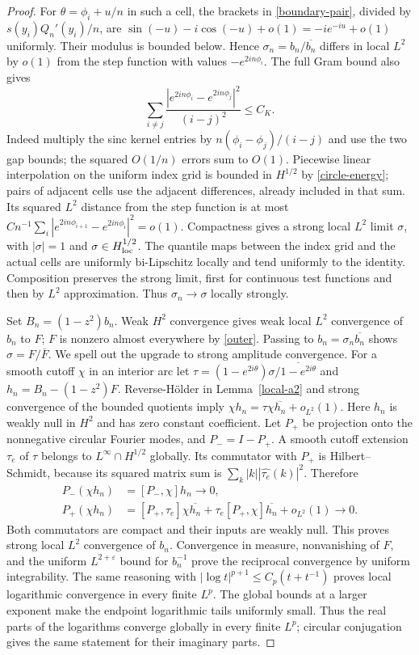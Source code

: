 \documentclass[a4paper,11pt]{amsart}
\theoremstyle{remark}\newtheorem{remark}[theorem]{Remark}
\begin{document}
\begin{proof}
For $\theta=\phi_i+u/n$ in such a cell, the brackets in
\eqref{boundary-pair}, divided by $s(y_i)Q_n'(y_i)/n$, are
$\sin(-u)-i\cos(-u)+o(1)=-ie^{-iu}+o(1)$ uniformly.
Their modulus is bounded below. Hence
$\sigma_n=b_n/\overline{b_n}$ differs in local $L^2$ by $o(1)$
from the step function with values $-e^{2in\phi_i}$.
The full Gram bound also gives
\begin{equation}\label{circle-energy}
 \sum_{i\ne j}\frac{|e^{2in\phi_i}-e^{2in\phi_j}|^2}{(i-j)^2}
 \le C_K.
\end{equation}
Indeed multiply the sinc kernel entries by
$n(\phi_i-\phi_j)/(i-j)$ and use the two gap bounds; the squared
$O(1/n)$ errors sum to $O(1)$.
Piecewise linear interpolation on the uniform index grid is bounded
in $H^{1/2}$ by \eqref{circle-energy}; pairs of adjacent cells use
the adjacent differences, already included in that sum. Its squared
$L^2$ distance from the step function is at most
$Cn^{-1}\sum_i|e^{2in\phi_{i+1}}-e^{2in\phi_i}|^2=o(1)$.
Compactness gives a strong local $L^2$ limit $\sigma$, with
$|\sigma|=1$ and $\sigma\in H^{1/2}_{\rm loc}$.
The quantile maps between the index grid and the actual cells are
uniformly bi-Lipschitz locally and tend uniformly to the identity.
Composition preserves the strong limit, first for continuous test
functions and then by $L^2$ approximation. Thus $\sigma_n\to\sigma$
locally strongly.

Set $B_n=(1-z^2)b_n$. Weak $H^2$ convergence gives weak local $L^2$
convergence of $b_n$ to $F$; $F$ is nonzero almost everywhere by
\eqref{outer}. Passing to $b_n=\sigma_n\overline{b_n}$ shows
$\sigma=F/\overline F$. We spell out the upgrade to strong amplitude
convergence. For a smooth cutoff $\chi$ in an interior arc let
$\tau=(1-e^{2i\theta})\sigma/\overline{1-e^{2i\theta}}$ and
$h_n=B_n-(1-z^2)F$. Reverse-H\"older in Lemma~\ref{local-a2} and
strong convergence of the bounded quotients imply
$\chi h_n=\tau\chi\overline{h_n}+o_{L^2}(1)$.
Here $h_n$ is weakly null in $H^2$ and has zero constant coefficient.
Let $P_+$ be projection onto the nonnegative circular Fourier modes,
and $P_-=I-P_+$. A smooth cutoff extension $\tau_e$ of $\tau$
belongs to $L^\infty\cap H^{1/2}$ globally. Its commutator with
$P_+$ is Hilbert--Schmidt, because its squared matrix sum is
$\sum_k|k||\widehat{\tau_e}(k)|^2$. Therefore
\begin{align*}
 P_-(\chi h_n)&=[P_-,\chi]h_n\longrightarrow0,\\
 P_+(\chi h_n)&=[P_+,\tau_e]\chi\overline{h_n}
 +\tau_e[P_+,\chi]\overline{h_n}+o_{L^2}(1)\longrightarrow0.
\end{align*}
Both commutators are compact and their inputs are weakly null.
This proves strong local $L^2$ convergence of $b_n$.
Convergence in measure, nonvanishing of $F$, and the uniform
$L^{2+\varepsilon}$ bound for $b_n^{-1}$ prove the reciprocal
convergence by uniform integrability. The same reasoning with
$|\log t|^{p+1}\le C_p(t+t^{-1})$ proves local logarithmic convergence
in every finite $L^p$. The global bounds at a larger exponent make
the endpoint logarithmic tails uniformly small. Thus the real parts
of the logarithms converge globally in every finite $L^p$; circular
conjugation gives the same statement for their imaginary parts.


\end{proof}
\end{document}
